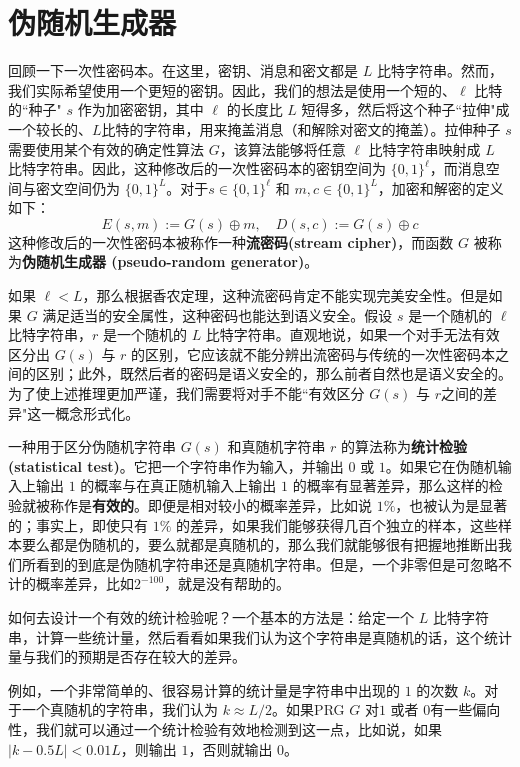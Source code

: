 \section{伪随机生成器}

回顾一下一次性密码本。在这里，密钥、消息和密文都是 $L$ 比特字符串。然而，我们实际希望使用一个更短的密钥。因此，我们的想法是使用一个短的、$\ell$ 比特的``种子" $s$ 作为加密密钥，其中 $\ell$ 的长度比 $L$ 短得多，然后将这个种子``拉伸"成一个较长的、$L$比特的字符串，用来掩盖消息（和解除对密文的掩盖）。拉伸种子 $s$ 需要使用某个有效的确定性算法 $G$，该算法能够将任意 $\ell$ 比特字符串映射成 $L$ 比特字符串。因此，这种修改后的一次性密码本的密钥空间为 $\{0,1\}^\ell$，而消息空间与密文空间仍为 $\{0,1\}^L$。对于$s\in\{0,1\}^\ell$ 和 $m,c\in\{0,1\}^L$，加密和解密的定义如下：
\[
E(s,m):=G(s)\oplus m,\quad
D(s,c):=G(s)\oplus c
\]
这种修改后的一次性密码本被称作一种\textbf{流密码(stream cipher)}，而函数 $G$ 被称为\textbf{伪随机生成器 (pseudo-random generator)}。

如果 $\ell<L$，那么根据香农定理，这种流密码肯定不能实现完美安全性。但是如果 $G$ 满足适当的安全属性，这种密码也能达到语义安全。假设 $s$ 是一个随机的 $\ell$ 比特字符串，$r$ 是一个随机的 $L$ 比特字符串。直观地说，如果一个对手无法有效区分出 $G(s)$ 与 $r$ 的区别，它应该就不能分辨出流密码与传统的一次性密码本之间的区别；此外，既然后者的密码是语义安全的，那么前者自然也是语义安全的。为了使上述推理更加严谨，我们需要将对手不能``有效区分 $G(s)$ 与 $r$之间的差异"这一概念形式化。

一种用于区分伪随机字符串 $G(s)$ 和真随机字符串 $r$ 的算法称为\textbf{统计检验(statistical test)}。它把一个字符串作为输入，并输出 $0$ 或 $1$。如果它在伪随机输入上输出 $1$ 的概率与在真正随机输入上输出 $1$ 的概率有显著差异，那么这样的检验就被称作是\textbf{有效的}。即便是相对较小的概率差异，比如说 $1\%$，也被认为是显著的；事实上，即使只有 $1\%$ 的差异，如果我们能够获得几百个独立的样本，这些样本要么都是伪随机的，要么就都是真随机的，那么我们就能够很有把握地推断出我们所看到的到底是伪随机字符串还是真随机字符串。但是，一个非零但是可忽略不计的概率差异，比如$2^{-100}$，就是没有帮助的。

如何去设计一个有效的统计检验呢？一个基本的方法是：给定一个 $L$ 比特字符串，计算一些统计量，然后看看如果我们认为这个字符串是真随机的话，这个统计量与我们的预期是否存在较大的差异。

例如，一个非常简单的、很容易计算的统计量是字符串中出现的 $1$ 的次数 $k$。对于一个真随机的字符串，我们认为 $k\approx{L}/{2}$。如果PRG $G$ 对$1$ 或者 $0$有一些偏向性，我们就可以通过一个统计检验有效地检测到这一点，比如说，如果 $|k-0.5L|<0.01L$，则输出 $1$，否则就输出 $0$。


